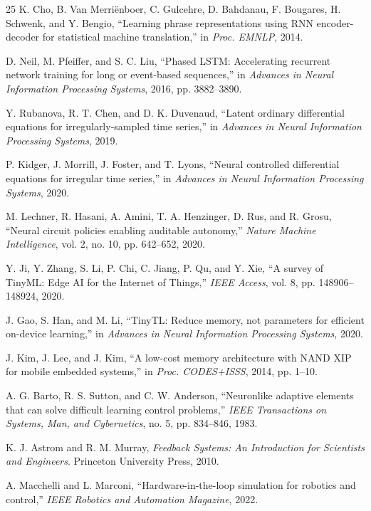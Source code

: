 \documentclass[conference]{IEEEtran}
\begin{document}
\begin{thebibliography}{25}
 K. Cho, B. Van Merri\"enboer, C. Gulcehre, D. Bahdanau, F. Bougares, H. Schwenk, and Y. Bengio, ``Learning phrase representations using RNN encoder-decoder for statistical machine translation,'' in \textit{Proc. EMNLP}, 2014.

 D. Neil, M. Pfeiffer, and S. C. Liu, ``Phased LSTM: Accelerating recurrent network training for long or event-based sequences,'' in \textit{Advances in Neural Information Processing Systems}, 2016, pp. 3882--3890.

 Y. Rubanova, R. T. Chen, and D. K. Duvenaud, ``Latent ordinary differential equations for irregularly-sampled time series,'' in \textit{Advances in Neural Information Processing Systems}, 2019.

 P. Kidger, J. Morrill, J. Foster, and T. Lyons, ``Neural controlled differential equations for irregular time series,'' in \textit{Advances in Neural Information Processing Systems}, 2020.

 M. Lechner, R. Hasani, A. Amini, T. A. Henzinger, D. Rus, and R. Grosu, ``Neural circuit policies enabling auditable autonomy,'' \textit{Nature Machine Intelligence}, vol. 2, no. 10, pp. 642--652, 2020.

 Y. Ji, Y. Zhang, S. Li, P. Chi, C. Jiang, P. Qu, and Y. Xie, ``A survey of TinyML: Edge AI for the Internet of Things,'' \textit{IEEE Access}, vol. 8, pp. 148906--148924, 2020.

 J. Gao, S. Han, and M. Li, ``TinyTL: Reduce memory, not parameters for efficient on-device learning,'' in \textit{Advances in Neural Information Processing Systems}, 2020.

 J. Kim, J. Lee, and J. Kim, ``A low-cost memory architecture with NAND XIP for mobile embedded systems,'' in \textit{Proc. CODES+ISSS}, 2014, pp. 1--10.

 A. G. Barto, R. S. Sutton, and C. W. Anderson, ``Neuronlike adaptive elements that can solve difficult learning control problems,'' \textit{IEEE Transactions on Systems, Man, and Cybernetics}, no. 5, pp. 834--846, 1983.

 K. J. Astrom and R. M. Murray, \textit{Feedback Systems: An Introduction for Scientists and Engineers}. Princeton University Press, 2010.

 A. Macchelli and L. Marconi, ``Hardware-in-the-loop simulation for robotics and control,'' \textit{IEEE Robotics and Automation Magazine}, 2022.


\end{thebibliography}
\end{document}
